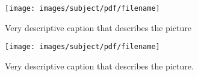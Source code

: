 % 
%
%
%

\begin{figure}[H]
    \centering
    \texttt{[image: images/subject/pdf/filename]}
    \caption{Very descriptive caption that describes the picture}
    \label{fig:unique_figure_label}
\end{figure}


\begin{figure}[H]
    \centering
    \texttt{[image: images/subject/pdf/filename]}
    \caption{Very descriptive caption that describes the picture.}
    \label{fig:PLEASE_FIX_ME}
\end{figure}

